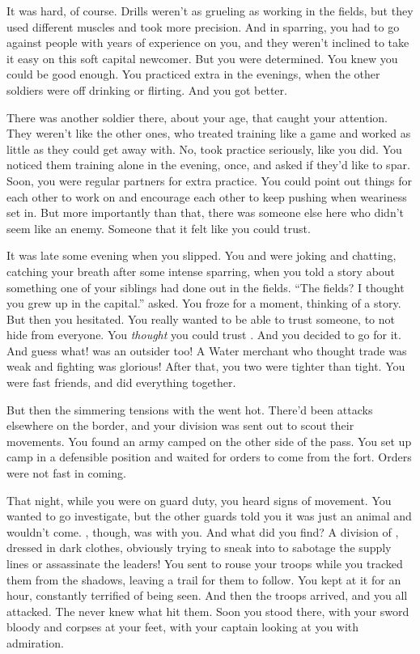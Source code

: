 \documentclass[char]{iron}
\begin{document}
It was hard, of course.  Drills weren't as grueling as working in the
fields, but they used different muscles and took more precision.  And
in sparring, you had to go against people with years of experience on
you, and they weren't inclined to take it easy on this soft capital
newcomer.  But you were determined.  You knew you could be good
enough.  You practiced extra in the evenings, when the other soldiers
were off drinking or flirting.  And you got better.

There was another soldier there, about your age, that caught your attention.
They weren't like the other ones, who treated training like a game and worked
as little as they could get away with.  No, \cLieutenant{\intro} took practice
seriously, like you did.  You noticed them training alone in the evening,
once, and asked if they'd like to spar.  Soon, you were regular partners
for extra practice.  You could point out things for each other to work on and
encourage each other to keep pushing when weariness set in. But more importantly
than that, there was someone else here who didn't seem like an enemy.  Someone
that it felt like you could trust.

It was late some evening when you slipped.  You and
\cLieutenant{\first} were joking and chatting, catching your breath
after some intense sparring, when you told a story about something one
of your siblings had done out in the fields.  ``The fields?  I thought
you grew up in the capital.''  \cLieutenant{\first} asked.  You froze
for a moment, thinking of a story.  But then you hesitated.  You
really wanted to be able to trust someone, to not hide from everyone.
You \emph{thought} you could trust \cLieutenant{\first}.  And you decided
to go for it.  And guess what!  \cLieutentant{\first} was an outsider too!
A Water merchant who thought trade was weak and fighting was glorious!
After that, you two were tighter than tight.  You were fast friends, and
did everything together.

But then the simmering tensions with the \sMulanCountryPeople{} went hot.
There'd been attacks elsewhere on the border, and your division was sent out
to scout their movements.  You found an army camped on the other side of the
pass.  You set up camp in a defensible position and waited for orders to come
from the fort.  Orders were not fast in coming.

That night, while you were on guard duty, you heard signs of movement.
You wanted to go investigate, but the other guards told you it was
just an animal and wouldn't come.  \cLieutentant{\first}, though, was
with you.  And what did you find?  A division of
\sMulanCountryPeople{}, dressed in dark clothes, obviously trying to
sneak into \sHomeCountry{} to sabotage the supply lines or assassinate
the leaders!  You sent \cLieutentant{\first} to rouse your troops
while you tracked them from the shadows, leaving a trail for them to
follow.  You kept at it for an hour, constantly terrified of being
seen.  And then the troops arrived, and you all attacked.  The
\sMulanCountryPeople{} never knew what hit them.  Soon you stood
there, with your sword bloody and corpses at your feet, with your captain
looking at you with admiration.
\end{document}
